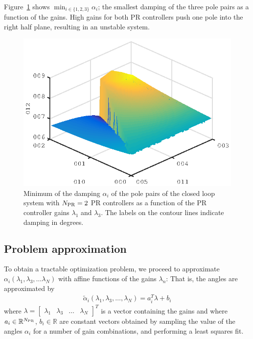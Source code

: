 \documentclass[conference,10pt]{IEEEtran}
\begin{document}
Figure~\ref{fig:DampingExample} shows $\min_{i\in\{1,2,3\}}\alpha_i$; the smallest damping of the three pole pairs as a function of the gains. High gains for both PR controllers push one pole into the right half plane, resulting in an unstable system.
\begin{figure}[!h]
\centering

\includegraphics{fig/root_locus_2D_in_3D}
\caption{Minimum of the damping $\alpha_i$ of the pole pairs of the closed loop system with $N_{\rm PR}=2$ PR controllers as a function of the PR controller gains $\lambda_1$ and $\lambda_3$. The labels on the contour lines indicate damping in degrees.}
\label{fig:DampingExample}
\end{figure}


\subsection{Problem approximation}

To obtain a tractable optimization problem, we proceed to approximate $\alpha_i(\lambda_1,\lambda_3,\dots\lambda_N)$ with affine functions of the gains $\lambda_n$: That is, the angles are approximated by
\begin{align}
\label{eq:AngleApprox}
\tilde{\alpha}_i(\lambda_1,\lambda_3,\dots, \lambda_N)
= a_i^T\lambda + b_i
\end{align}
where
$\lambda =
\begin{bmatrix}
\lambda_1 & \lambda_3 & \dots & \lambda_N
\end{bmatrix}^T$
is a vector containing the gains and where $a_i\in\mathbb{R}^{N_{\rm PR}}$, $b_i\in\mathbb{R}$ are constant vectors obtained by sampling the value of the angles
$\alpha_i$ for a number of gain combinations, and performing a least squares fit.
\end{document}
